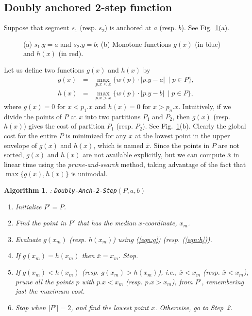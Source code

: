 \documentclass[preprint,10pt]{elsarticle}
\newtheorem{algorithm}{Algorithm}
\begin{document}
\subsection{Doubly anchored 2-step function}
Suppose that segment $s_1$ (resp. $s_2$) is anchored at $a$ (resp. $b$).
See Fig.~\ref{fig:anchored2}(a).
\begin{figure}[ht]
\centering
{}
\hspace{4mm}
\caption{(a) $s_1.y=a$ and $s_2.y=b$;
(b) Monotone functions $g(x)$ (in blue) and $h(x)$ (in red).
}
\label{fig:anchored2}
\end{figure}
Let us define two functions $g(x)$ and $h(x)$ by
\begin{eqnarray}
g(x) &=& \max_{p.x\leq x} \{w(p)\cdot|p.y - a|~\mid p\in P\},\label{eqn:g}\\
h(x) &=&\max_{p.x>x} \{w(p)\cdot |p.y - b|~\mid p\in P\},\label{eqn:h}
\end{eqnarray}
where $g(x) =0$ for $x <p_1.x$ and $h(x) =0$ for $x >p_n.x$.
Intuitively, if we divide the points of $P$ at $x$ into two partitions $P_1$ and $P_2$,
then $g(x)$ (resp. $h(x)$) gives the cost of partition $P_1$ (resp. $P_2$).
See Fig.~\ref{fig:anchored2}(b).
Clearly the global cost for the entire $P$ is minimized for any $x$
at the lowest point in the upper envelope of $g(x)$ and $h(x)$,
which is named $\overline{x}$.
Since the points in $P$ are not sorted,
$g(x)$ and $h(x)$ are not available explicitly,
but we can compute $\overline{x}$ in linear time using the {\em prune-and-search} method,
taking advantage of the fact that $\max\{g(x),h(x)\}$ is unimodal.

\begin{algorithm}{\rm :} {\tt Doubly-Anch-2-Step}$(P,a,b)$\label{alg:double}
\begin{enumerate}
\item
Initialize $P'=P$.
\item
Find the point in $P'$ that has the median $x$-coordinate, $x_m$.
\item
Evaluate $g(x_m)$ (resp. $h(x_m)$) using (\ref{eqn:g}) (resp. (\ref{eqn:h})).
\item
If $g(x_m) = h(x_m)$ then $\overline{x}=x_m$. Stop.
\item
If $g(x_m) < h(x_m)$ (resp. $g(x_m) > h(x_m)$), 
i.e., $\overline{x}< x_m$ (resp. $\overline{x}< x_m$),
prune all the points $p$ with $p.x < x_m$ (resp. $p.x > x_m$),
 from $P'$,
remembering just the maximum cost.
\item
Stop when $|P'|=2$, and find the lowest point $\overline{x}$.
Otherwise, go to Step~2.
\end{enumerate}
\end{algorithm}
\end{document}
